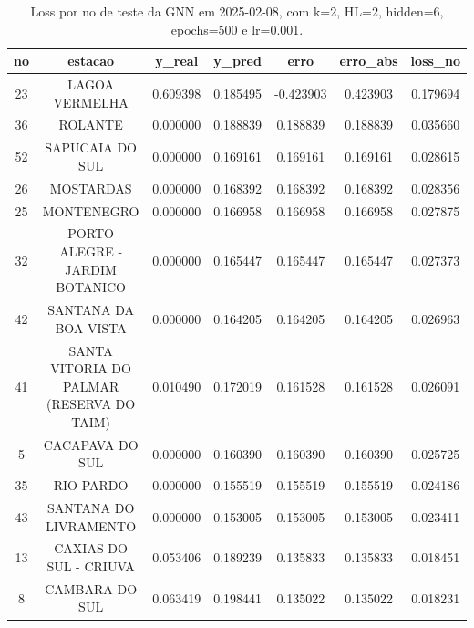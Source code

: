 \begin{table}[h]
\centering
\caption{Loss por no de teste da GNN em 2025-02-08, com k=2, HL=2, hidden=6, epochs=500 e lr=0.001.}
\label{tab:gnn_loss_k2_hl2_h6_e500_d20250208}
\begin{tabular}{ccccccc}
\toprule
no & estacao & y\_real & y\_pred & erro & erro\_abs & loss\_no \\
\midrule
23 & LAGOA VERMELHA & 0.609398 & 0.185495 & -0.423903 & 0.423903 & 0.179694 \\
36 & ROLANTE & 0.000000 & 0.188839 & 0.188839 & 0.188839 & 0.035660 \\
52 & SAPUCAIA DO SUL & 0.000000 & 0.169161 & 0.169161 & 0.169161 & 0.028615 \\
26 & MOSTARDAS & 0.000000 & 0.168392 & 0.168392 & 0.168392 & 0.028356 \\
25 & MONTENEGRO & 0.000000 & 0.166958 & 0.166958 & 0.166958 & 0.027875 \\
32 & PORTO ALEGRE - JARDIM BOTANICO & 0.000000 & 0.165447 & 0.165447 & 0.165447 & 0.027373 \\
42 & SANTANA DA BOA VISTA & 0.000000 & 0.164205 & 0.164205 & 0.164205 & 0.026963 \\
41 & SANTA VITORIA DO PALMAR (RESERVA DO TAIM) & 0.010490 & 0.172019 & 0.161528 & 0.161528 & 0.026091 \\
5 & CACAPAVA DO SUL & 0.000000 & 0.160390 & 0.160390 & 0.160390 & 0.025725 \\
35 & RIO PARDO & 0.000000 & 0.155519 & 0.155519 & 0.155519 & 0.024186 \\
43 & SANTANA DO LIVRAMENTO & 0.000000 & 0.153005 & 0.153005 & 0.153005 & 0.023411 \\
13 & CAXIAS DO SUL - CRIUVA & 0.053406 & 0.189239 & 0.135833 & 0.135833 & 0.018451 \\
8 & CAMBARA DO SUL & 0.063419 & 0.198441 & 0.135022 & 0.135022 & 0.018231 \\
\bottomrule
\end{tabular}
\end{table}

